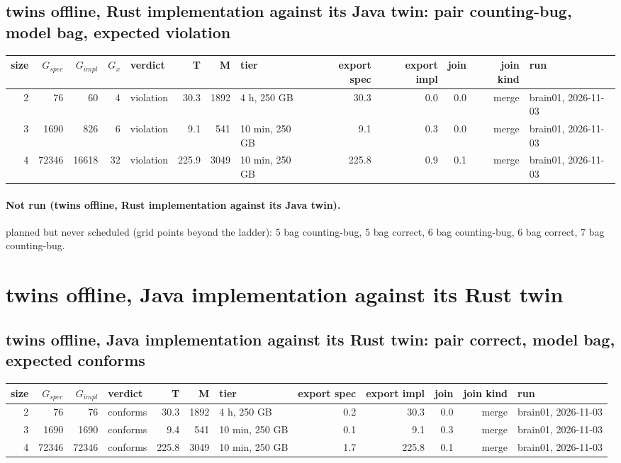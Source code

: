 \documentclass[10pt]{article}
\begin{document}
\subsection*{twins offline, Rust implementation against its Java twin: pair \textsf{counting-bug}, model bag, expected violation}
\begin{longtable}{@{}rrrrlrrlrrrrl@{}}
\toprule
size & $G_{\mathit{spec}}$ & $G_{\mathit{impl}}$ & $G_x$ & verdict & T & M & tier & export spec & export impl & join & join kind & run \\
\midrule
\endhead
\color{blue} 2 & 76 & 60 & 4 & violation & 30.3 & 1892 & 4 h, 250 GB & 30.3 & 0.0 & 0.0 & merge & brain01, 2026-11-03 \\
\color{blue} 3 & 1690 & 826 & 6 & violation & 9.1 & 541 & 10 min, 250 GB & 9.1 & 0.3 & 0.0 & merge & brain01, 2026-11-03 \\
\color{blue} 4 & 72346 & 16618 & 32 & violation & 225.9 & 3049 & 10 min, 250 GB & 225.8 & 0.9 & 0.1 & merge & brain01, 2026-11-03 \\
\bottomrule
\end{longtable}
\paragraph{Not run (twins offline, Rust implementation against its Java twin).}
planned but never scheduled (grid points beyond the ladder): 5 bag counting-bug, 5 bag correct, 6 bag counting-bug, 6 bag correct, 7 bag counting-bug.\par
\section*{twins offline, Java implementation against its Rust twin}
\subsection*{twins offline, Java implementation against its Rust twin: pair \textsf{correct}, model bag, expected conforms}
\begin{longtable}{@{}rrrlrrlrrrrl@{}}
\toprule
size & $G_{\mathit{spec}}$ & $G_{\mathit{impl}}$ & verdict & T & M & tier & export spec & export impl & join & join kind & run \\
\midrule
\endhead
\color{blue} 2 & 76 & 76 & conforms & 30.3 & 1892 & 4 h, 250 GB & 0.2 & 30.3 & 0.0 & merge & brain01, 2026-11-03 \\
\color{blue} 3 & 1690 & 1690 & conforms & 9.4 & 541 & 10 min, 250 GB & 0.1 & 9.1 & 0.3 & merge & brain01, 2026-11-03 \\
\color{blue} 4 & 72346 & 72346 & conforms & 225.8 & 3049 & 10 min, 250 GB & 1.7 & 225.8 & 0.1 & merge & brain01, 2026-11-03 \\
\bottomrule
\end{longtable}
\end{document}
